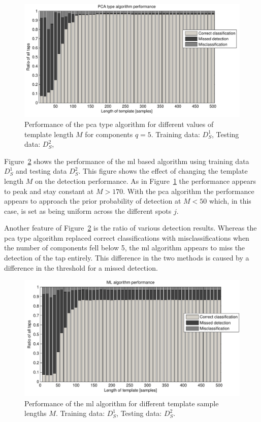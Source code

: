 \begin{figure}[!] %
\centering
\includegraphics[width=150mm]{PCAperformLength.pdf}
\caption{Performance of the \gls{pca} type algorithm for different values of template length $M$ for components $q=5$. Training data: $D^1_S$, Testing data: $D^2_S$,}\label{fig:PCAperformLength}
\end{figure}

Figure~\ref{fig:MLperform} shows the performance of the \gls{ml} based algorithm using training data $D^1_S$ and testing data $D^2_S$. This figure shows the effect of changing the template length $M$ on the detection performance. As in Figure~\ref{fig:PCAperformLength} the performance appears to peak and stay constant at $M>170$. With the \gls{pca} algorithm the performance appears to approach the prior probability of detection at $M<50$ which, in this case, is set as being uniform across the different spots $j$.

Another feature of Figure~\ref{fig:MLperform} is the ratio of various detection results. Whereas the \gls{pca} type algorithm replaced correct classifications with misclassifications when the number of components fell below 5, the \gls{ml} algorithm appears to miss the detection of the tap entirely. This difference in the two methods is caused by a difference in the threshold for a missed detection.


\begin{figure}[!] %
\centering
\includegraphics[width=150mm]{MLperform.pdf}
\caption{Performance of the \gls{ml} algorithm for different template sample lengths $M$. Training data: $D^1_S$, Testing data: $D^2_S$.}\label{fig:MLperform}
\end{figure}

